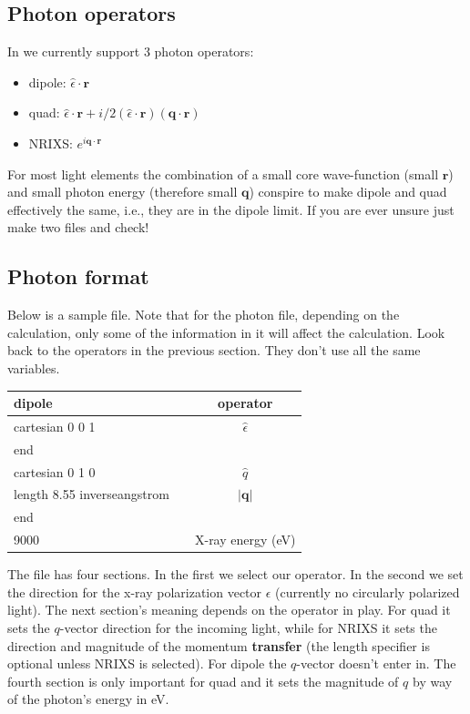 \documentclass[11pt]{report}
\begin{document}
\subsection{Photon operators}
In  we currently support 3 photon operators: 
\begin{itemize}
\item dipole: $\hat{\epsilon} \cdot \mathbf{r}$
\item quad: $\hat{\epsilon} \cdot \mathbf{r} + i/2 \left( \hat{\epsilon} \cdot \mathbf{r} \right) \left(\mathbf{q} \cdot \mathbf{r} \right)$
\item NRIXS: $e^{i \mathbf{q} \cdot \mathbf{r} }$
\end{itemize}
For most light elements the combination of a small core 
wave-function (small $\mathbf{r}$) and small photon energy (therefore small $\mathbf{q}$) 
conspire to make dipole and quad effectively the same, i.e., they are in the dipole limit. 
If you are ever unsure just make two  files and check!

\subsection{Photon format}
Below is a sample  file. Note that for the photon file, 
depending on the calculation, only some of the information in it will affect the calculation. 
Look back to the operators in the previous section. They don't use all the same variables. 

\begin{center}
\begin{tabular}{| l | c c|}
\hline
dipole				& & operator \\
\hline
cartesian  0  0  1		& & $\hat{\epsilon}$  \\
end			& & \\
\hline
cartesian  0  1  0		& & $\hat{q}$  \\
length 8.55 inverseangstrom && $\vert \mathbf{q} \vert$ \\
end			& & \\
\hline
9000 & & X-ray energy (eV) \\
\hline
\end{tabular}
\end{center}

The file has four sections. In the first we select our operator. 
In the second we set the direction for the x-ray polarization vector $\epsilon$ (currently no circularly polarized light). 
The next section's meaning depends on the operator in play. 
For quad it sets the $q$-vector direction for the incoming light, 
while for NRIXS it sets the direction and magnitude of the momentum \textbf{transfer} 
(the length specifier is optional unless NRIXS is selected). For dipole the $q$-vector doesn't enter in. 
The fourth section is only important for quad and it sets the magnitude of $q$ by way of the photon's energy in eV. 
\end{document}
